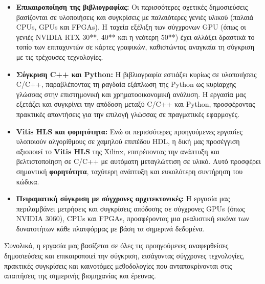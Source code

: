 \begin{itemize}
    \item \textbf{Επικαιροποίηση της βιβλιογραφίας:} Οι περισσότερες σχετικές δημοσιεύσεις βασίζονται σε υλοποιήσεις και συγκρίσεις με παλαιότερες γενιές υλικού (παλαιά CPUs, GPUs και FPGAs).
    Η ταχεία εξέλιξη των σύγχρονων GPU (όπως οι γενιές NVIDIA RTX 30**, 40** και η νεότερη 50**) έχει αλλάξει δραστικά το τοπίο των επιταχυντών σε κάρτες γραφικών, καθιστώντας αναγκαία τη σύγκριση με τις τρέχουσες τεχνολογίες.
    \item \textbf{Σύγκριση C++ και Python:} Η βιβλιογραφία εστιάζει κυρίως σε υλοποιήσεις C/C++, παραβλέποντας τη ραγδαία εξάπλωση της Python ως κυρίαρχης γλώσσας στην επιστημονική και χρηματοοικονομική ανάλυση.
    Η εργασία μας εξετάζει και συγκρίνει την απόδοση μεταξύ C/C++ και Python, προσφέροντας πρακτικές απαντήσεις για την επιλογή γλώσσας σε πραγματικές εφαρμογές.
    \item \textbf{Vitis HLS και φορητότητα:} Ενώ οι περισσότερες προηγούμενες εργασίες υλοποιούν αλγορίθμους σε χαμηλού επιπέδου HDL, η δική μας προσέγγιση αξιοποιεί το \textbf{Vitis HLS} της Xilinx,
    επιτρέποντας την ανάπτυξη και βελτιστοποίηση σε C/C++ με αυτόματη μεταγλώττιση σε υλικό. Αυτό προσφέρει σημαντική \textbf{φορητότητα}, ταχύτερη ανάπτυξη και ευκολότερη συντήρηση του κώδικα.
    \item \textbf{Πειραματική σύγκριση με σύγχρονες αρχιτεκτονικές:} Η εργασία μας περιλαμβάνει μετρήσεις και συγκρίσεις απόδοσης σε σύγχρονες GPUs (όπως NVIDIA 3060), CPUs και FPGAs,
    προσφέροντας μια ρεαλιστική εικόνα των δυνατοτήτων κάθε πλατφόρμας με βάση τα σημερινά δεδομένα.
\end{itemize}

Συνολικά, η εργασία μας βασίζεται σε όλες τις προηγούμενες αναφερθείσες δημοσιεύσεις και επικαιροποιεί την σύγκριση, εισάγοντας σύγχρονες τεχνολογίες, πρακτικές συγκρίσεις και καινοτόμες μεθοδολογίες
που ανταποκρίνονται στις απαιτήσεις της σημερινής βιομηχανίας και έρευνας.
